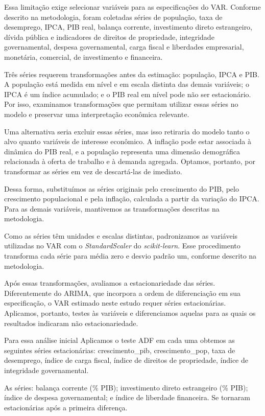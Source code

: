 Essa limitação exige selecionar variáveis para as especificações do VAR. Conforme descrito na metodologia, foram coletadas séries de população, taxa de desemprego, IPCA, PIB real, balança corrente, investimento direto estrangeiro, dívida pública e indicadores de direitos de propriedade, integridade governamental, despesa governamental, carga fiscal e liberdades empresarial, monetária, comercial, de investimento e financeira.

Três séries requerem transformações antes da estimação: população, IPCA e PIB. A população está medida em nível e em escala distinta das demais variáveis; o IPCA é um índice acumulado; e o PIB real em nível pode não ser estacionário. Por isso, examinamos transformações que permitam utilizar essas séries no modelo e preservar uma interpretação econômica relevante.

Uma alternativa seria excluir essas séries, mas isso retiraria do modelo tanto o alvo quanto variáveis de interesse econômico. A inflação pode estar associada à dinâmica do PIB real, e a população representa uma dimensão demográfica relacionada à oferta de trabalho e à demanda agregada. Optamos, portanto, por transformar as séries em vez de descartá-las de imediato.

Dessa forma, substituímos as séries originais pelo crescimento do PIB, pelo crescimento populacional e pela inflação, calculada a partir da variação do IPCA. Para as demais variáveis, mantivemos as transformações descritas na metodologia.

Como as séries têm unidades e escalas distintas, padronizamos as variáveis utilizadas no VAR com o \textit{StandardScaler} do \textit{scikit-learn}. Esse procedimento transforma cada série para média zero e desvio padrão um, conforme descrito na metodologia.

Após essas transformações, avaliamos a estacionariedade das séries. Diferentemente do ARIMA, que incorpora a ordem de diferenciação em sua especificação, o VAR estimado neste estudo requer séries estacionárias. Aplicamos, portanto, testes às variáveis e diferenciamos aquelas para as quais os resultados indicaram não estacionariedade.

Para essa análise inicial Aplicamos o teste ADF em cada uma obtemos as seguintes séries estacionárias: crescimento\_pib, crescimento\_pop, taxa de desemprego, índice de carga fiscal, índice de direitos de propriedade, índice de integridade governamental. 

As séries: balança corrente (\% PIB); investimento direto estrangeiro (\% PIB); índice de despesa governamental; e índice de liberdade financeira. Se tornaram estacionárias após a primeira diferença.

